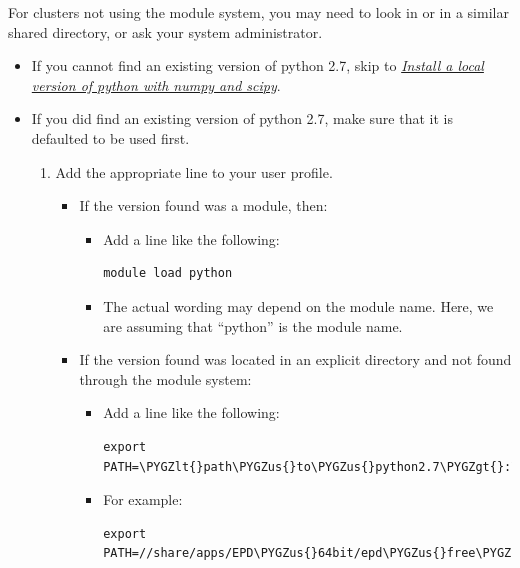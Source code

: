 \documentclass[letterpaper,10pt,english]{sphinxmanual}
\def\PYGZus{\char`\_}
\def\PYGZlt{\char`\<}
\def\PYGZgt{\char`\>}
\def\PYGZdl{\char`\$}
\def\PYGZhy{\char`\-}
\begin{document}
For clusters not using the module system, you may need to look in  or in a similar shared directory, or ask your system administrator.
\begin{itemize}
\item {} 
If you cannot find an existing version of python 2.7, skip to {\hyperref[1_0_installation:install-local-python]{\emph{Install a local version of python with numpy and scipy}}}.

\item {} 
If you did find an existing version of python 2.7, make sure that it is defaulted to be used first.
\begin{enumerate}
\item {} 
Add the appropriate line to your user profile.
\begin{itemize}
\item {} 
If the version found was a module, then:
\begin{itemize}
\item {} 
Add a line like the following:

\begin{Verbatim}[commandchars=\\\{\}]
module load python
\end{Verbatim}

\item {} 
The actual wording may depend on the module name. Here, we are assuming that ``python'' is the module name.

\end{itemize}

\item {} 
If the version found was located in an explicit directory and not found through the module system:
\begin{itemize}
\item {} 
Add a line like the following:

\begin{Verbatim}[commandchars=\\\{\}]
export PATH=\PYGZlt{}path\PYGZus{}to\PYGZus{}python2.7\PYGZgt{}:\PYGZdl{}PATH
\end{Verbatim}

\item {} 
For example:

\begin{Verbatim}[commandchars=\\\{\}]
export PATH=//share/apps/EPD\PYGZus{}64bit/epd\PYGZus{}free\PYGZhy{}7.3\PYGZhy{}2\PYGZhy{}rh5\PYGZhy{}x86\PYGZus{}64/bin:\PYGZdl{}PATH
\end{Verbatim}


\end{itemize}
\end{itemize}
\end{enumerate}
\end{itemize}
\end{document}
